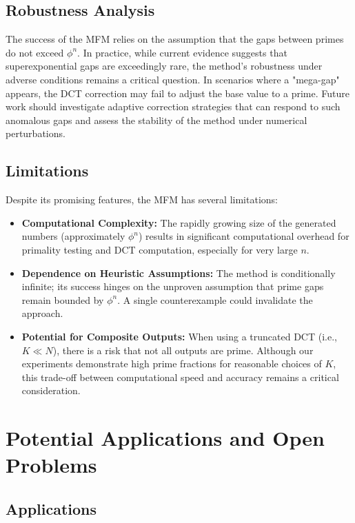 \documentclass[12pt]{article}
\begin{document}
\subsection{Robustness Analysis}
The success of the MFM relies on the assumption that the gaps between primes do not exceed $\phi^n$. In practice, while current evidence suggests that superexponential gaps are exceedingly rare, the method's robustness under adverse conditions remains a critical question. In scenarios where a "mega-gap" appears, the DCT correction may fail to adjust the base value to a prime. Future work should investigate adaptive correction strategies that can respond to such anomalous gaps and assess the stability of the method under numerical perturbations.

\subsection{Limitations}
Despite its promising features, the MFM has several limitations:
\begin{itemize}
    \item \textbf{Computational Complexity:} The rapidly growing size of the generated numbers (approximately $\phi^n$) results in significant computational overhead for primality testing and DCT computation, especially for very large $n$.
    \item \textbf{Dependence on Heuristic Assumptions:} The method is conditionally infinite; its success hinges on the unproven assumption that prime gaps remain bounded by $\phi^n$. A single counterexample could invalidate the approach.
    \item \textbf{Potential for Composite Outputs:} When using a truncated DCT (i.e., $K\ll N$), there is a risk that not all outputs are prime. Although our experiments demonstrate high prime fractions for reasonable choices of $K$, this trade-off between computational speed and accuracy remains a critical consideration.
\end{itemize}

\section{Potential Applications and Open Problems}\label{sec:openprobs}

\subsection{Applications}
\end{document}
